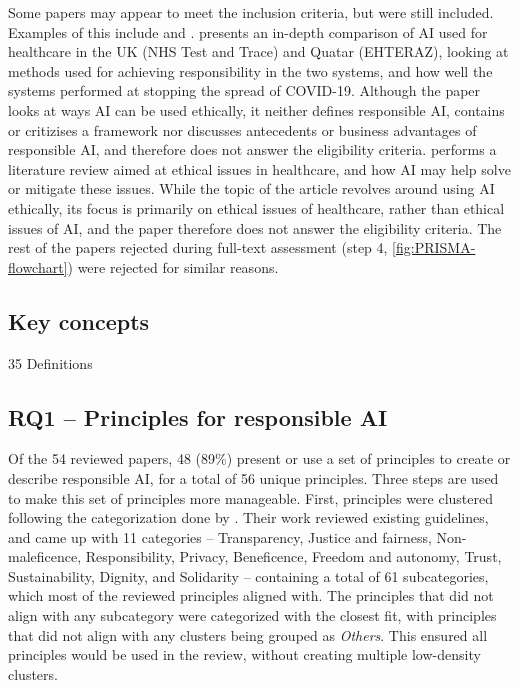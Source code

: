 Some papers may appear to meet the inclusion criteria, but were still included. Examples of this include \textcite{ElHaddadeh_2021} and \textcite{Trocin_2021}. \textcite{ElHaddadeh_2021} presents an in-depth comparison of AI used for healthcare in the UK (NHS Test and Trace) and Quatar (EHTERAZ), looking at methods used for achieving responsibility in the two systems, and how well the systems performed at stopping the spread of COVID-19. Although the paper looks at ways AI can be used ethically, it neither defines responsible AI, contains or critizises a framework nor discusses antecedents or business advantages of responsible AI, and therefore does not answer the eligibility criteria. \textcite{Trocin_2021} performs a literature review aimed at ethical issues in healthcare, and how AI may help solve or mitigate these issues. While the topic of the article revolves around using AI ethically, its focus is primarily on ethical issues of healthcare, rather than ethical issues of AI, and the paper therefore does not answer the eligibility criteria. The rest of the papers rejected during full-text assessment (step 4, \autoref{fig:PRISMA-flowchart}) were rejected for similar reasons.


\subsection{Key concepts}
{35 Definitions}


\subsection{RQ1 -- Principles for responsible AI}
\label{sec:results-rq1}
Of the 54 reviewed papers, 48 (89\%) present or use a set of principles to create or describe responsible AI, for a total of 56 unique principles. Three steps are used to make this set of principles more manageable. First, principles were clustered following the categorization done by \textcite{Ryan_2021}. Their work reviewed existing guidelines, and came up with 11 categories -- Transparency, Justice and fairness, Non-maleficence, Responsibility, Privacy, Beneficence, Freedom and autonomy, Trust, Sustainability, Dignity, and Solidarity -- containing a total of 61 subcategories, which most of the reviewed principles aligned with. The principles that did not align with any subcategory were categorized with the closest fit, with principles that did not align with any clusters being grouped as \textit{Others}. This ensured all principles would be used in the review, without creating multiple low-density clusters.

